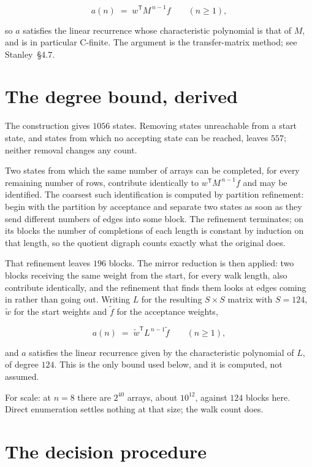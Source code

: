 \documentclass[11pt]{article}
\theoremstyle{definition}
\begin{document}
\[a(n) \;=\; w^{\mathsf T} M^{\,n-1} f \qquad (n \ge 1),\]

so $a$ satisfies the linear recurrence whose characteristic polynomial is that of $M$, and is in particular C-finite. The argument is the transfer-matrix method; see Stanley~\S4.7.

\section{The degree bound, derived}

The construction gives $1056$ states. Removing states unreachable from a start state, and states from which no accepting state can be reached, leaves $557$; neither removal changes any count.

Two states from which the same number of arrays can be completed, for every remaining number of rows, contribute identically to $w^{\mathsf T}M^{\,n-1}f$ and may be identified. The coarsest such identification is computed by partition refinement: begin with the partition by acceptance and separate two states as soon as they send different numbers of edges into some block. The refinement terminates; on its blocks the number of completions of each length is constant by induction on that length, so the quotient digraph counts exactly what the original does.

That refinement leaves $196$ blocks. The mirror reduction is then applied: two blocks receiving the same weight from the start, for every walk length, also contribute identically, and the refinement that finds them looks at edges coming in rather than going out. Writing $L$ for the resulting $S \times S$ matrix with $S = 124$, $\tilde w$ for the start weights and $\tilde f$ for the acceptance weights,

\[a(n) \;=\; \tilde w^{\mathsf T} L^{\,n-1} \tilde f \qquad (n \ge 1),\]

and $a$ satisfies the linear recurrence given by the characteristic polynomial of $L$, of degree $124$. This is the only bound used below, and it is computed, not assumed.

For scale: at $n = 8$ there are $2^{40}$ arrays, about $10^{12}$, against $124$ blocks here. Direct enumeration settles nothing at that size; the walk count does.

\section{The decision procedure}
\end{document}
